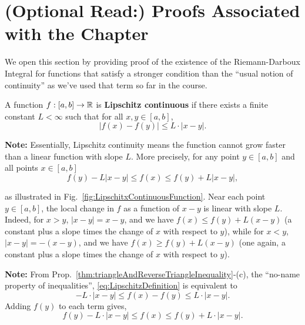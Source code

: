 \section{(Optional Read:) Proofs Associated with the Chapter}
\label{sec:ProofsChap03}

We open this section by providing proof of the existence of the Riemann-Darboux Integral for functions that satisfy a stronger condition than the ``usual notion of continuity'' as we've used that term so far in the course.

\bigskip

\begin{tcolorbox}[colback=mylightblue, title = {\bf Lipschitz Continuity}, breakable]

\begin{definition}  A function $f:[a, b] \to \mathbb R$ is \textbf{Lipschitz continuous} if there exists a finite constant $L < \infty$ such that for all $x, y \in [a, b]$,
\begin{equation}
\label{eq:LipschitzDefinition}
    |f(x) -f(y)| \le L \cdot |x -y|.
\end{equation}
\bigskip

\textbf{Note:} Essentially, Lipschitz continuity means the function cannot grow faster than a linear function with slope $L$. More precisely, for any point $y \in [a, b]$ and all points $x \in [a, b]$
\begin{equation}
\label{eq:LipschitzEquivalentDefinition}
    f(y) - L|x-y| \leq f(x) \leq f(y) + L|x-y|,
\end{equation}    
\end{definition}
as illustrated in Fig.~\ref{fig:LipschitxContinuousFunction}. Near each point $y\in [a, b]$, the local change in $f$ as a function of $x-y$ is linear with slope $L$. Indeed, for $x>y$, $|x-y|=x-y$, and we have $f(x) \le f(y) + L(x-y)$ (a constant plus a slope times the change of $x$ with respect to $y$), while for $x < y$, $|x-y|= -(x-y)$, and we have $f(x) \ge f(y) + L(x-y)$ (one again, a constant plus a slope times the change of $x$ with respect to $y$).
\end{tcolorbox}


\bigskip
\textbf{Note:} From Prop.~\ref{thm:triangleAndReverseTriangleInequality}-(c), the ``no-name property of inequalities'', \eqref{eq:LipschitzDefinition} is equivalent to 
$$-L \cdot |x -y| \le f(x) - f(y) \le L \cdot |x -y|.$$
Adding $f(y)$ to each term gives,
$$f(y) -L \cdot |x -y| \le f(x) \le f(y) + L \cdot |x -y|.$$


